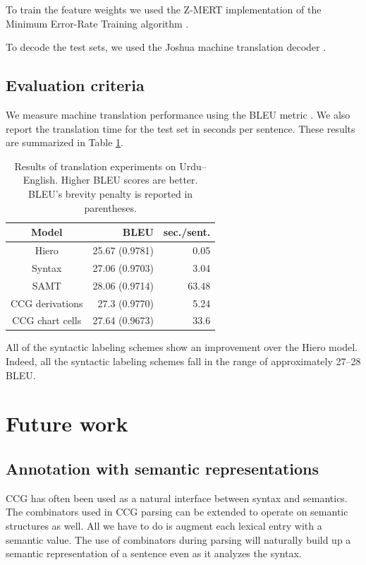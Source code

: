 \documentclass[a4paper]{article}
\begin{document}
To train the feature weights we used the Z-MERT implementation \cite{zmert} of the Minimum Error-Rate Training algorithm \cite{mert}.

To decode the test sets, we used the Joshua machine translation decoder \cite{joshua3}.

\subsection{Evaluation criteria}

We measure machine translation performance using the BLEU metric \cite{papineni-bleu}. We also report the translation time for the test set in seconds per sentence. These results are summarized in Table \ref{table:results}.

\begin{table}
\centering
\begin{tabular}{|c|r|r|}
\hline
Model & BLEU & sec./sent. \\
\hline
Hiero & 25.67 (0.9781) & 0.05 \\
Syntax & 27.06 (0.9703) & 3.04 \\
SAMT & 28.06 (0.9714) & 63.48 \\
CCG derivations & 27.3 (0.9770) & 5.24 \\
CCG chart cells & 27.64 (0.9673) & 33.6 \\
\hline
\end{tabular}
\caption{Results of translation experiments on Urdu--English. Higher BLEU scores are better. BLEU's brevity penalty is reported in parentheses.\label{table:results}}
\end{table}

All of the syntactic labeling schemes show an improvement over the Hiero model. Indeed, all the syntactic labeling schemes fall in the range of approximately 27--28 BLEU.

\section{Future work}

\subsection{Annotation with semantic representations}

CCG has often been used as a natural interface between syntax and semantics. The combinators used in CCG parsing can be extended to operate on semantic structures as well. All we have to do is augment each lexical entry with a semantic value. The use of combinators during parsing will naturally build up a semantic representation of a sentence even as it analyzes the syntax.
\end{document}
